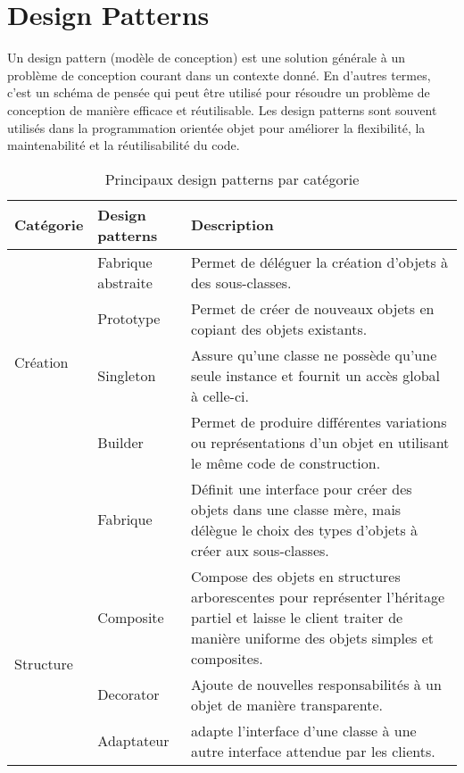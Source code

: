 \section{Design Patterns}\label{sec:designpatterns}
\begin{minipage}[t]{1\textwidth}
\begin{definition}
Un design pattern (modèle de conception) est une solution générale à un problème de conception courant dans un contexte donné. En d'autres termes, c'est un schéma de pensée qui peut être utilisé pour résoudre un problème de conception de manière efficace et réutilisable. Les design patterns sont souvent utilisés dans la programmation orientée objet pour améliorer la flexibilité, la maintenabilité et la réutilisabilité du code.
\end{definition}
\begin{table}[H]
\caption{Principaux design patterns par catégorie}
\label{tbl:design_patterns}
\begin{adjustbox}{max width=\textwidth}
\begin{tabular}{l|p{7em}|p{38em}}
\toprule
\textbf{Catégorie} & \textbf{Design patterns} & \textbf{Description} \\
\midrule
\multirow{4}{*}{Création} 
& Fabrique abstraite & Permet de déléguer la création d'objets à des sous-classes.\\
\cmidrule(lr){2-3}
& Prototype & Permet de créer de nouveaux objets en copiant des objets existants.\\
\cmidrule(lr){2-3}
& Singleton & Assure qu'une classe ne possède qu'une seule instance et fournit un accès global à celle-ci.\\
\cmidrule(lr){2-3}
& Builder & Permet de produire différentes variations ou représentations d’un objet en utilisant le même code de construction.\\
\cmidrule(lr){2-3}
& Fabrique & Définit une interface pour créer des objets dans une classe mère, mais délègue le choix des types d’objets à créer aux sous-classes.\\
\midrule
\multirow{6}{*}{Structure} 
& Composite & Compose des objets en structures arborescentes pour représenter l'héritage partiel et laisse le client traiter de manière uniforme des objets simples et composites.\\
\cmidrule(lr){2-3}
& Decorator & Ajoute de nouvelles responsabilités à un objet de manière transparente.\\
\cmidrule(lr){2-3}
& Adaptateur & adapte l'interface d'une classe à une autre interface attendue par les clients.\\

\end{tabular}
\end{adjustbox}
\end{table}
\end{minipage}
